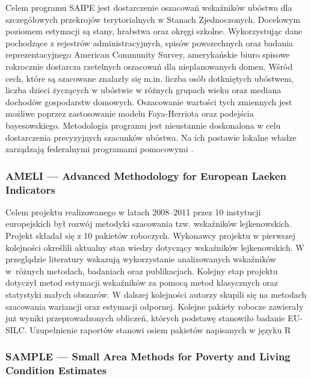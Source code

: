 Celem programu SAIPE jest dostarczenie oszacowań wskaźników ubóstwa dla szczegółowych przekrojów terytorialnych w Stanach Zjednoczonych. Docelowym poziomem estymacji są stany, hrabstwa oraz okręgi szkolne. Wykorzystując dane pochodzące z rejestrów administracyjnych, spisów powszechnych oraz badania reprezentacyjnego American Community Survey, amerykańskie biuro spisowe rokrocznie dostarcza rzetelnych oszacowań dla nieplanowanych domen. Wśród cech, które są szacowane znalazły się m.in. liczba osób dotkniętych ubóstwem, liczba dzieci życzących w ubóstwie w różnych grupach wieku oraz mediana dochodów gospodarstw domowych. Oszacowanie wartości tych zmiennych jest możliwe poprzez zastosowanie modelu Faya-Herriota oraz podejścia bayesowskiego. Metodologia programu jest nieustannie doskonalona w celu dostarczenia precyzyjnych szacunków ubóstwa. Na ich postawie lokalne władze zarządzają federalnymi programami pomocowymi \citep{saipe}.

\subsubsection*{AMELI --- Advanced Methodology for European Laeken Indicators}

Celem projektu realizowanego w latach 2008--2011 przez 10 instytucji europejskich był rozwój metodyki szacowania tzw. wskaźników lejkenowskich. Projekt składał się z 10 pakietów roboczych. Wykonawcy projektu w pierwszej kolejności określili aktualny stan wiedzy dotyczący wskaźników lejkenowskich. W przeglądzie literatury wskazują wykorzystanie analizowanych wskaźników w~różnych metodach, badaniach oraz publikacjach. Kolejny etap projektu dotyczył metod estymacji wskaźników za pomocą metod klasycznych oraz statystyki małych obszarów. W dalszej kolejności autorzy skupili się na metodach szacowania wariancji oraz estymacji odpornej. Kolejne pakiety robocze zawierały już wyniki przeprowadzonych obliczeń, których podstawę stanowiło badanie EU-SILC. Uzupełnienie raportów stanowi osiem pakietów napisanych w języku R \citep{ameli}

\subsubsection*{SAMPLE --- Small Area Methods for Poverty and Living Condition Estimates}

